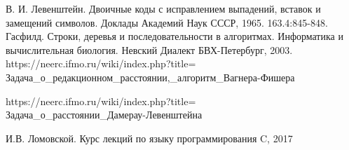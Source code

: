 \documentclass[a4paper, 14pt]{article}
\begin{document}
    \newpage

    \begin{thebibliography}{9} 
     В. И. Левенштейн. Двоичные коды с исправлением выпадений, вставок и замещений символов. Доклады Академий Наук СССР, 1965. 163.4:845-848. 
     Гасфилд. Строки, деревья и последовательности в алгоритмах. Информатика и вычислительная биология. Невский Диалект БВХ-Петербург, 2003. 
    https://neerc.ifmo.ru/wiki/index.php?title=\\Задача\_о\_редакционном\_расстоянии,\_алгоритм\_Вагнера-Фишера
    
    https://neerc.ifmo.ru/wiki/index.php?title=\\Задача\_о\_расстоянии\_Дамерау-Левенштейна
    
    И.В. Ломовской. Курс лекций по языку программирования C, 2017
    
    \end{thebibliography}

		
		
		
\end{document}
